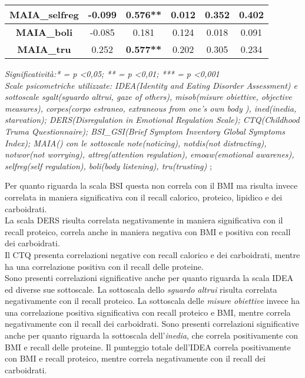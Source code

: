 \documentclass[12pt]{article}
\begin{document}
\begin{table}[H]
{{\begin{tabular}{|c|c|c|c|c|c|}
        \textbf{MAIA\_selfreg} & -0.099& \textbf{0.576**}& 0.012& 0.352& 0.402\\\hline
        \textbf{MAIA\_boli} & -0.085& 0.181& 0.124& 0.018& 0.091\\\hline
        \textbf{MAIA\_tru} & 0.252& \textbf{0.577**}& 0.202& 0.305& 0.234\\\hline
    \end{tabular}%
    }}
    \label{tab:my_label}
    \footnotesize \textit{Significatività:* = p <0,05; ** = p <0,01; *** = p <0,001 \\ Scale psicometriche utilizzate: IDEA(Identity and Eating Disorder Assessment) e sottoscale sgalt(sguardo altrui, gaze of others), misob(misure obiettive, objective measures), corpes(corpo estraneo, extraneous from one's own body ), ined(inedia, starvation); DERS(Disregulation in Emotional Regulation Scale); CTQ(Childhood Truma Questionnaire); BSI\_GSI(Brief Symptom Inventory Global Symptoms Index); MAIA() con le sottoscale note(noticing), notdis(not distracting), notwor(not worrying), attreg(attention regulation), emoaw(emotional awarenes), selfreg(self regulation), boli(body listening), tru(trusting) };
\end{table}

Per quanto riguarda la scala BSI questa non correla con il BMI ma risulta invece correlata in maniera significativa con il recall calorico, proteico, lipidico e dei carboidrati.\\
La scala DERS risulta correlata negativamente in maniera significativa con il recall proteico, correla anche in maniera negativa con BMI e positiva con recall dei carboidrati.\\
Il CTQ presenta correlazioni negative con recall calorico e dei carboidrati, mentre ha una correlazione positiva con il recall delle proteine. \\

Sono presenti correlazioni significative anche per quanto riguarda la scala IDEA ed diverse sue sottoscale. La sottoscala dello \emph{sguardo altrui} risulta correlata negativamente con il recall proteico. La sottoscala delle \emph{misure obiettive} invece ha una correlazione positiva significativa con recall proteico e BMI, mentre correla negativamente con il recall dei carboidrati. Sono presenti correlazioni significative anche per quanto riguarda la sottoscala dell'\emph{inedia}, che correla positivamente con BMI e recall delle proteine. Il punteggio totale dell'IDEA correla positivamente con BMI e recall proteico, mentre correla negativamente con il recall dei carboidrati.
\end{document}
